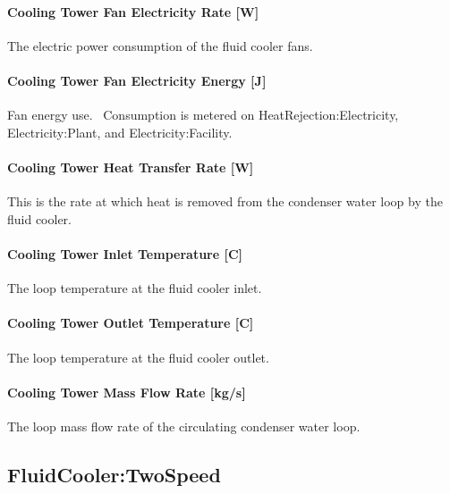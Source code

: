 \paragraph{Cooling Tower Fan Electricity Rate {[}W{]}}\label{cooling-tower-fan-electric-power-w-6}

The electric power consumption of the fluid cooler fans.

\paragraph{Cooling Tower Fan Electricity Energy {[}J{]}}\label{cooling-tower-fan-electric-energy-j-6}

Fan energy use.~ Consumption is metered on HeatRejection:Electricity, Electricity:Plant, and Electricity:Facility.

\paragraph{Cooling Tower Heat Transfer Rate {[}W{]}}\label{cooling-tower-heat-transfer-rate-w-6}

This is the rate at which heat is removed from the condenser water loop by the fluid cooler.

\paragraph{Cooling Tower Inlet Temperature {[}C{]}}\label{cooling-tower-inlet-temperature-c-6}

The loop temperature at the fluid cooler inlet.

\paragraph{Cooling Tower Outlet Temperature {[}C{]}}\label{cooling-tower-outlet-temperature-c-6}

The loop temperature at the fluid cooler outlet.

\paragraph{Cooling Tower Mass Flow Rate {[}kg/s{]}}\label{cooling-tower-mass-flow-rate-kgs-6}

The loop mass flow rate of the circulating condenser water loop.

\subsection{FluidCooler:TwoSpeed}\label{fluidcoolertwospeed}

